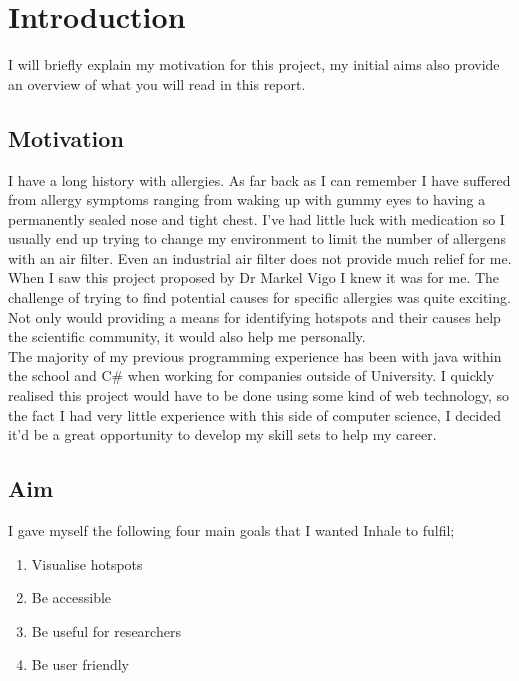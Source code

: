 \chapter{Introduction}
\label{cha:intro}

I will briefly explain my motivation for this project, my initial aims also provide an overview of what you will read in this report.

\section{Motivation} 
I have a long history with allergies. As far back as I can remember I have suffered from allergy symptoms ranging from waking up with gummy eyes to having a permanently sealed nose and tight chest. I've had little luck with medication so I usually end up trying to change my environment to limit the number of allergens with an air filter. Even an industrial air filter does not provide much relief for me.\\

When I saw this project proposed by Dr Markel Vigo I knew it was for me. The challenge of trying to find potential causes for specific allergies was quite exciting. Not only would providing a means for identifying hotspots and their causes help the scientific community, it would also help me personally.\\

The majority of my previous programming experience has been with java within the school and C\# when working for companies outside of University. I quickly realised this project would have to be done using some kind of web technology, so the fact I had very little experience with this side of computer science, I decided it'd be a great opportunity to develop my skill sets to help my career.\\

\section{Aim}
\label{sec:aim}

I gave myself the following four main goals that I wanted Inhale to fulfil;

\begin{enumerate}
  \item Visualise hotspots
  \item Be accessible
  \item Be useful for researchers
  \item Be user friendly
\end{enumerate}


